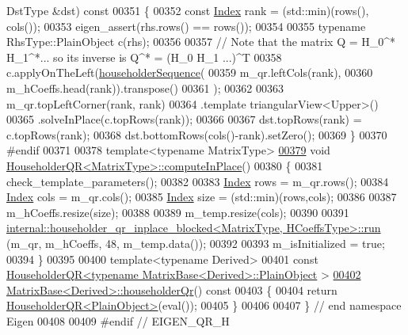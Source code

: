 \begin{DoxyCode}
      DstType &dst)\textcolor{keyword}{ const}
00351 \textcolor{keyword}{}\{
00352   \textcolor{keyword}{const} \hyperlink{namespace_eigen_a62e77e0933482dafde8fe197d9a2cfde}{Index} rank = (std::min)(rows(), cols());
00353   eigen\_assert(rhs.rows() == rows());
00354 
00355   \textcolor{keyword}{typename} RhsType::PlainObject c(rhs);
00356 
00357   \textcolor{comment}{// Note that the matrix Q = H\_0^* H\_1^*... so its inverse is Q^* = (H\_0 H\_1 ...)^T}
00358   c.applyOnTheLeft(\hyperlink{group___householder___module_ga4bd4b85120e014cf1125a054b02d4d92}{householderSequence}(
00359     m\_qr.leftCols(rank),
00360     m\_hCoeffs.head(rank)).transpose()
00361   );
00362 
00363   m\_qr.topLeftCorner(rank, rank)
00364       .template triangularView<Upper>()
00365       .solveInPlace(c.topRows(rank));
00366 
00367   dst.topRows(rank) = c.topRows(rank);
00368   dst.bottomRows(cols()-rank).setZero();
00369 \}
00370 \textcolor{preprocessor}{#endif}
00371 
00378 \textcolor{keyword}{template}<\textcolor{keyword}{typename} MatrixType>
\hyperlink{group___q_r___module_a3a16530338a734971fc45efb0ef9ac94}{00379} \textcolor{keywordtype}{void} \hyperlink{group___q_r___module_a3a16530338a734971fc45efb0ef9ac94}{HouseholderQR<MatrixType>::computeInPlace}()
00380 \{
00381   check\_template\_parameters();
00382   
00383   \hyperlink{namespace_eigen_a62e77e0933482dafde8fe197d9a2cfde}{Index} rows = m\_qr.rows();
00384   \hyperlink{namespace_eigen_a62e77e0933482dafde8fe197d9a2cfde}{Index} cols = m\_qr.cols();
00385   \hyperlink{namespace_eigen_a62e77e0933482dafde8fe197d9a2cfde}{Index} size = (std::min)(rows,cols);
00386 
00387   m\_hCoeffs.resize(size);
00388 
00389   m\_temp.resize(cols);
00390 
00391   \hyperlink{struct_eigen_1_1internal_1_1householder__qr__inplace__blocked}{internal::householder\_qr\_inplace\_blocked<MatrixType, HCoeffsType>::run}
      (m\_qr, m\_hCoeffs, 48, m\_temp.data());
00392 
00393   m\_isInitialized = \textcolor{keyword}{true};
00394 \}
00395 
00400 \textcolor{keyword}{template}<\textcolor{keyword}{typename} Derived>
00401 \textcolor{keyword}{const} \hyperlink{group___q_r___module_class_eigen_1_1_householder_q_r}{HouseholderQR<typename MatrixBase<Derived>::PlainObject}
      >
\hyperlink{group___core___module_a9a9377aab1cea26db5f25bab7e682f8f}{00402} \hyperlink{group___core___module_a9a9377aab1cea26db5f25bab7e682f8f}{MatrixBase<Derived>::householderQr}()\textcolor{keyword}{ const}
00403 \textcolor{keyword}{}\{
00404   \textcolor{keywordflow}{return} \hyperlink{group___q_r___module_class_eigen_1_1_householder_q_r}{HouseholderQR<PlainObject>}(eval());
00405 \}
00406 
00407 \} \textcolor{comment}{// end namespace Eigen}
00408 
00409 \textcolor{preprocessor}{#endif // EIGEN\_QR\_H}
\end{DoxyCode}
